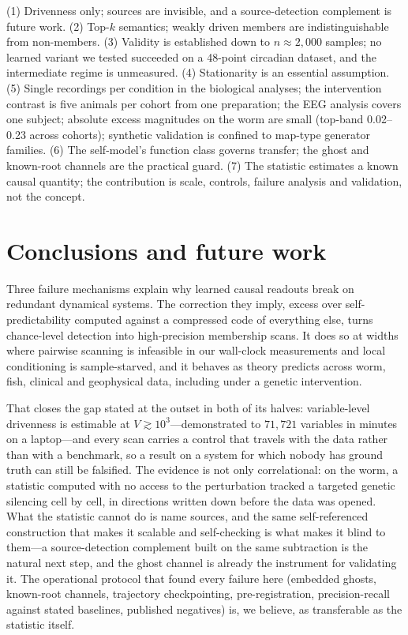 \documentclass[11pt]{article}
\begin{document}
(1) Drivenness only; sources are invisible, and a source-detection
complement is future work. (2) Top-$k$ semantics; weakly driven members are
indistinguishable from non-members. (3) Validity is established down to $n\approx2{,}000$ samples; no
learned variant we tested succeeded on a 48-point circadian dataset, and
the intermediate regime is unmeasured. (4)
Stationarity is an essential assumption. (5) Single recordings per condition in the biological analyses; the
intervention contrast is five animals per cohort from one preparation; the
EEG analysis covers one subject; absolute excess magnitudes on the worm are small (top-band 0.02--0.23
across cohorts); synthetic validation is confined to map-type generator
families. (6) The self-model's function class governs transfer;
the ghost and known-root channels are the practical guard. (7) The
statistic estimates a known causal quantity; the contribution is scale,
controls, failure analysis and validation, not the concept.

\section{Conclusions and future work}
\label{sec:concl}

Three failure mechanisms explain why learned causal readouts break on
redundant dynamical systems. The correction they imply, excess over
self-predictability computed against a compressed code of everything else,
turns chance-level detection into high-precision membership
scans. It does so at widths where pairwise scanning is infeasible in our
wall-clock measurements and local conditioning is sample-starved, and it
behaves as theory predicts across worm, fish, clinical and geophysical
data, including under a genetic intervention.

That closes the gap stated at the outset in both of its halves: variable-level drivenness is estimable at $V \gtrsim 10^3$---demonstrated to $71{,}721$ variables in minutes on a laptop---and every scan carries a control that travels with the data rather than with a benchmark, so a result on a system for which nobody has ground truth can still be falsified. The evidence is not only correlational: on the worm, a statistic computed with no access to the perturbation tracked a targeted genetic silencing cell by cell, in directions written down before the data was opened. What the statistic cannot do is name sources, and the same self-referenced construction that makes it scalable and self-checking is what makes it blind to them---a source-detection complement built on the same subtraction is the natural next step, and the ghost channel is already the instrument for validating it. The operational protocol that found every failure here
(embedded ghosts, known-root channels, trajectory checkpointing,
pre-registration, precision-recall against stated baselines, published
negatives) is, we believe, as transferable as the statistic itself.
\end{document}
